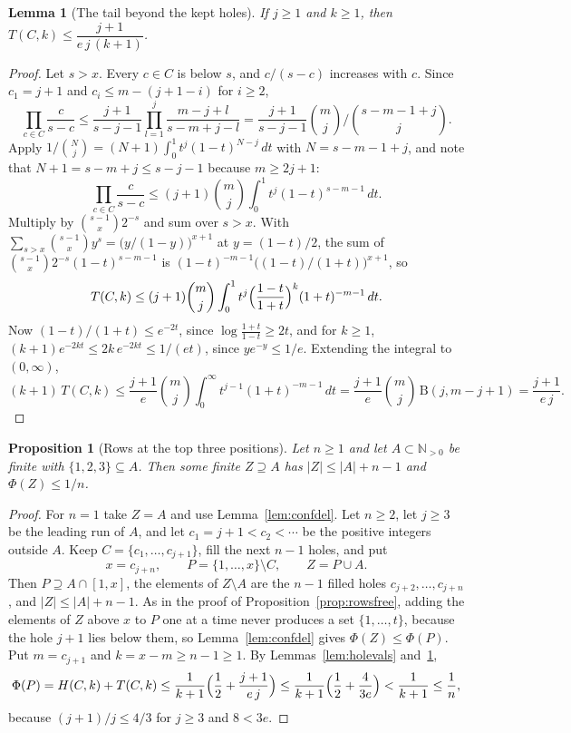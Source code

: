 \documentclass[11pt]{article}
\newtheorem{lemma}[theorem]{Lemma}
\newtheorem{proposition}[theorem]{Proposition}
\newcommand{\N}{\mathbb N}
\begin{document}
\begin{lemma}[The tail beyond the kept holes]\label{lem:holetail}
If $j\ge1$ and $k\ge1$, then $T(C,k)\le\dfrac{j+1}{e\,j\,(k+1)}$.
\end{lemma}

\begin{proof}
Let $s>x$.  Every $c\in C$ is below $s$, and $c/(s-c)$ increases with $c$.
Since $c_1=j+1$ and $c_i\le m-(j+1-i)$ for $i\ge2$,
\[
  \prod_{c\in C}\frac c{s-c}
  \le\frac{j+1}{s-j-1}\prod_{l=1}^{j}\frac{m-j+l}{s-m+j-l}
  =\frac{j+1}{s-j-1}\binom mj\Big/\binom{s-m-1+j}j .
\]
Apply $1/\binom Nj=(N+1)\int_0^1t^j(1-t)^{N-j}\,dt$ with $N=s-m-1+j$, and
note that $N+1=s-m+j\le s-j-1$ because $m\ge2j+1$:
\[
  \prod_{c\in C}\frac c{s-c}\le(j+1)\binom mj\int_0^1t^j(1-t)^{s-m-1}\,dt .
\]
Multiply by $\binom{s-1}x2^{-s}$ and sum over $s>x$.  With
$\sum_{s>x}\binom{s-1}xy^s=\bigl(y/(1-y)\bigr)^{x+1}$ at $y=(1-t)/2$, the
sum of $\binom{s-1}x2^{-s}(1-t)^{s-m-1}$ is
$(1-t)^{-m-1}\bigl((1-t)/(1+t)\bigr)^{x+1}$, so
\[
  T(C,k)\le(j+1)\binom mj\int_0^1t^j
     \Bigl(\frac{1-t}{1+t}\Bigr)^k(1+t)^{-m-1}\,dt .
\]
Now $(1-t)/(1+t)\le e^{-2t}$, since $\log\frac{1+t}{1-t}\ge2t$, and for
$k\ge1$, $(k+1)e^{-2kt}\le2k\,e^{-2kt}\le1/(et)$, since $ye^{-y}\le1/e$.
Extending the integral to $(0,\infty)$,
\[
  (k+1)\,T(C,k)\le\frac{j+1}e\binom mj\int_0^\infty t^{j-1}(1+t)^{-m-1}\,dt
  =\frac{j+1}e\binom mj\,\mathrm B(j,m-j+1)=\frac{j+1}{e\,j}.
\]
\end{proof}

\begin{proposition}[Rows at the top three positions]\label{prop:rowstop}
Let $n\ge1$ and let $A\subset\N_{>0}$ be finite with $\{1,2,3\}\subseteq A$.
Then some finite $Z\supseteq A$ has $|Z|\le|A|+n-1$ and $\Phi(Z)\le1/n$.
\end{proposition}

\begin{proof}
For $n=1$ take $Z=A$ and use Lemma~\ref{lem:confdel}.  Let $n\ge2$, let
$j\ge3$ be the leading run of $A$, and let $c_1=j+1<c_2<\cdots$ be the
positive integers outside $A$.  Keep $C=\{c_1,\ldots,c_{j+1}\}$, fill the
next $n-1$ holes, and put
\[
  x=c_{j+n},\qquad P=\{1,\ldots,x\}\setminus C,\qquad Z=P\cup A .
\]
Then $P\supseteq A\cap[1,x]$, the elements of $Z\setminus A$ are the $n-1$
filled holes $c_{j+2},\ldots,c_{j+n}$, and $|Z|\le|A|+n-1$.  As in the proof
of Proposition~\ref{prop:rowsfree}, adding the elements of $Z$ above $x$ to
$P$ one at a time never produces a set $\{1,\ldots,t\}$, because the hole
$j+1$ lies below them, so Lemma~\ref{lem:confdel} gives
$\Phi(Z)\le\Phi(P)$.  Put $m=c_{j+1}$ and $k=x-m\ge n-1\ge1$.  By
Lemmas~\ref{lem:holevals} and~\ref{lem:holetail},
\[
  \Phi(P)=H(C,k)+T(C,k)\le\frac1{k+1}\Bigl(\frac12+\frac{j+1}{e\,j}\Bigr)
  \le\frac1{k+1}\Bigl(\frac12+\frac4{3e}\Bigr)<\frac1{k+1}\le\frac1n,
\]
because $(j+1)/j\le4/3$ for $j\ge3$ and $8<3e$.
\end{proof}
\end{document}
